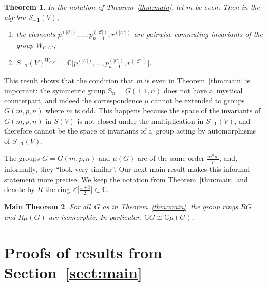\documentclass[11pt]{article}
\newtheorem{Theorem}{Theorem}[section]
\newtheorem{maintheorem}[Theorem]{Main Theorem}
\begin{document}
\begin{Theorem}
In the notation of Theorem~{\rm \ref{thm:main}}, let $m$ be even.
Then in the algebra $S_{\mathbf{-1}}(V)$,
\begin{enumerate}\itemsep=0pt
\item[$(a)$] the elements $p_1^{(|\mathcal C|)},\ldots,p_{n-1}^{(|\mathcal C|)}, r^{(|\mathcal C'|)}$ are pairwise commuting
invariants of the group $W_{\mathcal C,\mathcal C'}$;

\item[$(b)$] $S_{\mathbf{-1}}(V)^{W_{\mathcal C,\mathcal C'}} = \mathbb C\big[p_1^{(|\mathcal C|)},\ldots,p_{n-1}^{(|\mathcal C|)},r^{(|\mathcal C'|)}\big]$.
\end{enumerate}
\end{Theorem}

\begin{Remark}%
This result shows that the condition that $m$ is even in Theorem~\ref{thm:main} is important: the symmetric group
$\mathbb S_n=G(1,1,n)$ does not have a~mystical counterpart, and indeed the correspondence $\mu$ cannot be extended to
groups $G(m,p,n)$ where $m$ is odd.
This happens because the space of the invariants of $G(m,p,n)$ in $S(V)$ is not closed under the multiplication in
$S_{\mathbf{-1}}(V)$, and therefore cannot be the space of invariants of a~group acting by automorphisms of
$S_{\mathbf{-1}}(V)$.
\end{Remark}

The groups $G=G(m,p,n)$ and $\mu(G)$ are of the same order $\frac{m^n n!}{p}$, and, informally, they ``look very similar''.
Our next main result makes this informal statement more precise.
We keep the notation from Theorem~\ref{thm:main} and denote by $R$ the ring $\mathbb
Z\big[\frac{1+\mathbf{i}}{2}\big]\subset\mathbb C$.
\begin{maintheorem}
\label{thm:main2}
For all~$G$ as in Theorem~{\rm \ref{thm:main}}, the group rings $RG$ and $R\mu(G)$ are isomorphic.
In particular, $ \mathbb C G \cong \mathbb C \mu(G) $.
\end{maintheorem}
\setcounter{section}{2}
\setcounter{subsection}{0}
\setcounter{subsubsection}{0}
\setcounter{Theorem}{14}
\setcounter{equation}{0}
\section{Proofs of results from Section~\ref{sect:main}}
\end{document}
